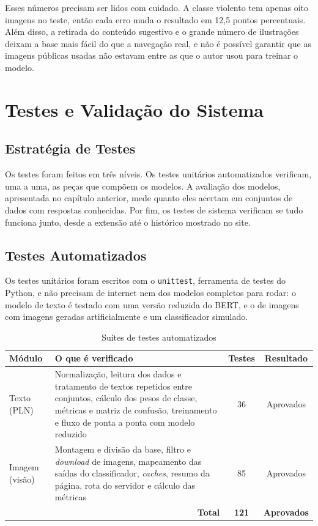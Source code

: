 \documentclass[
    12pt,           %
    oneside,        %
    a4paper,        %
    chapter=TITLE,  %
    english,        %
    brazil          %
]{abntex2}
\begin{document}
Esses números precisam ser lidos com cuidado. A classe violento tem apenas
oito imagens no teste, então cada erro muda o resultado em 12,5 pontos
percentuais. Além disso, a retirada do conteúdo sugestivo e o grande número
de ilustrações deixam a base mais fácil do que a navegação real, e não é
possível garantir que as imagens públicas usadas não estavam entre as que o
autor usou para treinar o modelo.
\chapter{Testes e Validação do Sistema}

\section{Estratégia de Testes}

Os testes foram feitos em três níveis. Os testes unitários automatizados
verificam, uma a uma, as peças que compõem os modelos. A avaliação dos
modelos, apresentada no capítulo anterior, mede quanto eles acertam em
conjuntos de dados com respostas conhecidas. Por fim, os testes de sistema
verificam se tudo funciona junto, desde a extensão até o histórico mostrado no
site.
\section{Testes Automatizados}

Os testes unitários foram escritos com o \texttt{unittest}, ferramenta de
testes do Python, e não precisam de internet nem dos modelos completos para
rodar: o modelo de texto é testado com uma versão reduzida do BERT, e o de
imagens com imagens geradas artificialmente e um classificador simulado.
\begin{table}[htbp]
\centering
\small
\renewcommand{\arraystretch}{1.3}
\begin{tabular}{|p{3.0cm}|p{8.2cm}|c|c|}
\hline
\textbf{Módulo} & \textbf{O que é verificado} & \textbf{Testes} & \textbf{Resultado} \\ \hline
Texto (PLN) & Normalização, leitura dos dados e tratamento de textos repetidos entre conjuntos, cálculo dos pesos de classe, métricas e matriz de confusão, treinamento e fluxo de ponta a ponta com modelo reduzido & 36 & Aprovados \\ \hline
Imagem (visão) & Montagem e divisão da base, filtro e \textit{download} de imagens, mapeamento das saídas do classificador, \textit{caches}, resumo da página, rota do servidor e cálculo das métricas & 85 & Aprovados \\ \hline
\multicolumn{2}{|r|}{\textbf{Total}} & \textbf{121} & \textbf{Aprovados} \\ \hline
\end{tabular}
\caption{Suítes de testes automatizados}
\label{tab:testes-automatizados}
\end{table}
\end{document}
